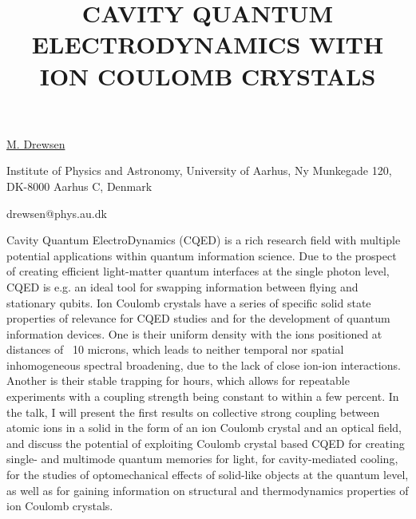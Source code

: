 \title{CAVITY QUANTUM ELECTRODYNAMICS WITH ION COULOMB \mbox{CRYSTALS}}

\underline{M. Drewsen} 

\vspace{-4mm}
{\normalsize{Institute of Physics and Astronomy, University of Aarhus, Ny
Munkegade 120, DK-8000 Aarhus C, Denmark

\email drewsen@phys.au.dk}}

Cavity Quantum ElectroDynamics (CQED) is a rich research field with multiple potential applications within quantum information science. Due to the prospect of creating efficient light-matter quantum interfaces at the single photon level, CQED is e.g. an ideal tool for swapping information between flying and stationary qubits. Ion Coulomb crystals have a series of specific solid state properties of relevance for CQED studies and for the development of quantum information devices. One is their uniform density with the ions positioned at distances of ~10 microns, which leads to neither temporal nor spatial inhomogeneous spectral broadening, due to the lack of close ion-ion interactions. Another is their stable trapping for hours, which allows for repeatable experiments with a coupling strength being constant to within a few percent.
In the talk, I will present the first results on collective strong coupling between atomic ions in a solid in the form of an ion Coulomb crystal and an optical field, and discuss the potential of exploiting Coulomb crystal based CQED for creating single- and multimode quantum memories for light, for cavity-mediated cooling, for the studies of optomechanical effects of solid-like objects at the quantum level, as well as for gaining information on structural and thermodynamics properties of ion Coulomb crystals.

\vspace{\baselineskip}